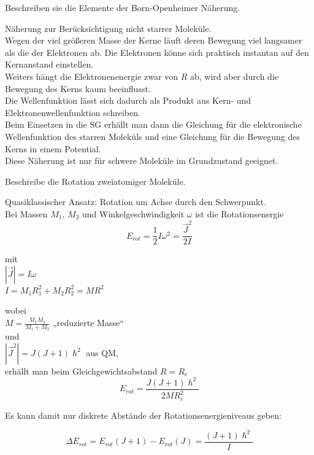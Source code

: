\documentclass[a5paper,12pt,ngerman,print,grid=front]{kartei}
\begin{document}
	\begin{karte}{
		Beschreiben sie die Elemente der Born-Openheimer Näherung.
		}
		
		Näherung zur Berücksichtigung nicht starrer Moleküle. \\
		
		Wegen der viel größeren Masse der Kerne läuft deren Bewegung viel langsamer als die der Elektronen ab. Die Elektronen könne sich praktisch instantan auf den Kernanstand einstellen.\\
		
		Weiters hängt die Elektronenenergie zwar von $R$ ab, wird aber durch die Bewegung des Kerns kaum beeinflusst. \\
		
		Die Wellenfunktion lässt sich dadurch als Produkt aus Kern- und Elektronenwellenfunktion schreiben. \\
		
		Beim Einsetzen in die SG erhällt man dann die Gleichung für die elektronische Wellenfunktion des starren Moleküls und eine Gleichung für die Bewegung des Kerns in einem Potential. \\
		
		Diese Näherung ist nur für schwere Moleküle im Grundzustand geeignet.
		
		
	\end{karte}


	\begin{karte}{
		Beschreibe die Rotation zweiatomiger Moleküle.
		}
		
		Quasiklassischer Ansatz: Rotation um Achse durch den Schwerpunkt. \\
		Bei Massen $M_1$, $M_2$ und Winkelgeschwindigkeit $\omega$ ist die Rotationsenergie 
		$$E_{rot} = \frac{1}{2} I \omega^2 = \frac{\vec{J}^2}{2 I}$$
		
		mit \\
		$ |\vec{J}|=I \omega  $ \\
		$ I = M_1 R_1^2 + M_2 R_2^2 = M R^2 $
		
		wobei \\
		$ M = \frac{M_1 M_2}{M_1 + M_2} $ „reduzierte Masse“ \\
		und \\
		$ |\vec{J}^2| = J(J+1){\hslash}^2 $ aus QM, \\
		erhällt man beim Gleichgewichtsabstand $ R = R_e $ \\
		
		$$ E_{rot} = \frac{J(J+1)\hslash^2}{2 M R_e^2}  $$
		
		Es kann damit nur diskrete Abstände der Rotationsenergieniveaus geben:
		
		$$       \Delta E_{rot} = E_{rot} (J+1) - E_{rot} (J) = \frac{( J+1 ) \hslash^2 }{ I }       $$
		
	\end{karte}
\end{document}
